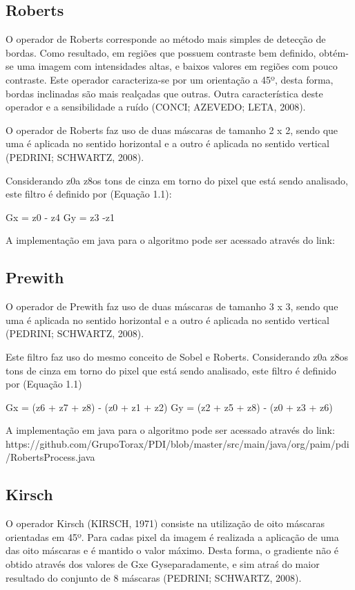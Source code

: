\documentclass[
	12pt,				%
	oneside,			%
	a4paper,			%
	english,			%
	french,				%
	spanish,			%
	brazil,				%
	]{abntex2}
\begin{document}
\subsection{Roberts}
O operador de Roberts corresponde ao método mais simples de detecção de bordas. Como resultado, em regiões que possuem contraste bem definido, obtém-se uma imagem com intensidades altas, e baixos valores em regiões com pouco contraste. Este operador caracteriza-se por um orientação a 45º, desta forma, bordas inclinadas são mais realçadas que outras. Outra característica deste operador e a sensibilidade a ruído (CONCI; AZEVEDO; LETA, 2008).

O operador de Roberts faz uso de duas máscaras de tamanho 2 x 2, sendo que uma é aplicada no sentido horizontal e a outro é aplicada no sentido vertical (PEDRINI; SCHWARTZ, 2008).

Considerando z0a z8os tons de cinza em torno do pixel que está sendo analisado, este filtro é definido por (Equação 1.1):

Gx = z0 - z4
Gy = z3 -z1

A implementação em java para o algoritmo pode ser acessado através do link:

\subsection{Prewith}

O operador de Prewith faz uso de duas máscaras de tamanho 3 x 3, sendo que uma é aplicada no sentido horizontal e a outro é aplicada no sentido vertical (PEDRINI; SCHWARTZ, 2008).	

Este filtro faz uso do mesmo conceito de Sobel e Roberts. Considerando z0a z8os tons de cinza em torno do pixel que está sendo analisado, este filtro é definido por (Equação 1.1)

Gx = (z6 + z7 + z8) - (z0 + z1 + z2)
Gy = (z2 + z5 + z8) - (z0 + z3 + z6)

 A implementação em java para o algoritmo pode ser acessado através do link:
https://github.com/GrupoTorax/PDI/blob/master/src/main/java/org/paim/pdi/RobertsProcess.java 

\subsection{Kirsch}
O operador Kirsch (KIRSCH, 1971) consiste na utilização de oito máscaras orientadas em 45º. Para cadas pixel da imagem é realizada a aplicação de uma das oito máscaras e é mantido o valor máximo. Desta forma, o gradiente não é obtido através dos valores de Gxe Gyseparadamente, e sim  atraś do maior resultado do conjunto de 8 máscaras (PEDRINI; SCHWARTZ, 2008).
\end{document}

